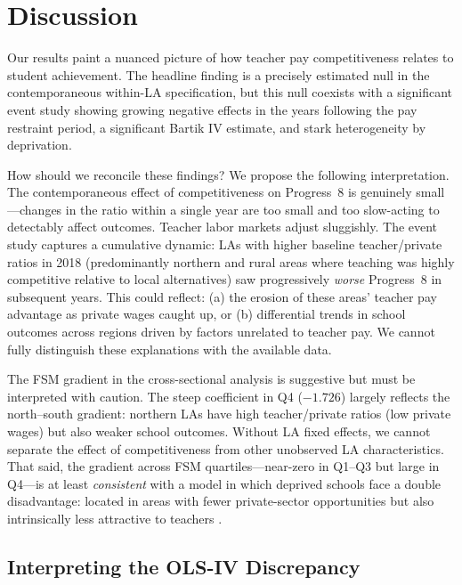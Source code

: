 \documentclass[12pt]{article}
\begin{document}
\section{Discussion}

Our results paint a nuanced picture of how teacher pay competitiveness relates to student achievement. The headline finding is a precisely estimated null in the contemporaneous within-LA specification, but this null coexists with a significant event study showing growing negative effects in the years following the pay restraint period, a significant Bartik IV estimate, and stark heterogeneity by deprivation.

How should we reconcile these findings? We propose the following interpretation. The contemporaneous effect of competitiveness on Progress~8 is genuinely small---changes in the ratio within a single year are too small and too slow-acting to detectably affect outcomes. Teacher labor markets adjust sluggishly. The event study captures a cumulative dynamic: LAs with higher baseline teacher/private ratios in 2018 (predominantly northern and rural areas where teaching was highly competitive relative to local alternatives) saw progressively \textit{worse} Progress~8 in subsequent years. This could reflect: (a) the erosion of these areas' teacher pay advantage as private wages caught up, or (b) differential trends in school outcomes across regions driven by factors unrelated to teacher pay. We cannot fully distinguish these explanations with the available data.

The FSM gradient in the cross-sectional analysis is suggestive but must be interpreted with caution. The steep coefficient in Q4 ($-1.726$) largely reflects the north--south gradient: northern LAs have high teacher/private ratios (low private wages) but also weaker school outcomes. Without LA fixed effects, we cannot separate the effect of competitiveness from other unobserved LA characteristics. That said, the gradient across FSM quartiles---near-zero in Q1--Q3 but large in Q4---is at least \textit{consistent} with a model in which deprived schools face a double disadvantage: located in areas with fewer private-sector opportunities but also intrinsically less attractive to teachers \citep{clotfelter2008would, loeb2004qualifications}.

\subsection{Interpreting the OLS-IV Discrepancy}
\end{document}
